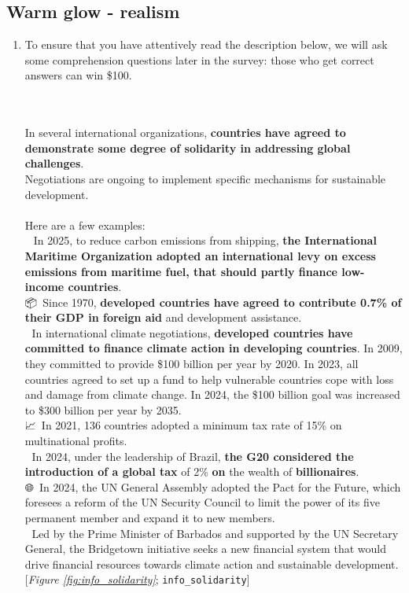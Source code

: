  \subsection*{Warm glow - realism} 
 \begin{enumerate}[resume] 
\item  \label{q:info_solidarity} To ensure that you have attentively read the description below, we will ask some comprehension questions later in the survey: those who get correct answers can win \$100.

~\\\\In several international organizations, \textbf{countries have agreed to demonstrate some degree of solidarity in addressing global challenges}.\\
Negotiations are ongoing to implement specific mechanisms for sustainable development.\\\\Here are a few examples:\\🚢~In 2025, to reduce carbon emissions from shipping, \textbf{the International Maritime Organization adopted an international levy on excess emissions from maritime fuel, that should partly finance low-income countries}.\\📦~Since 1970, \textbf{developed countries have agreed to contribute 0.7\% of their GDP in foreign aid} and development assistance.\\
🌱 In international climate negotiations, \textbf{developed countries have committed to finance climate action in developing countries}. In 2009, they committed to provide \$100 billion per year by 2020. In 2023, all countries agreed to set up a fund to help vulnerable countries cope with loss and damage from climate change. In 2024, the \$100 billion goal was increased to \$300 billion per year by 2035.\\📈~In 2021, 136 countries adopted a minimum tax rate of 15\% on multinational profits.\\💎 In 2024, under the leadership of Brazil, \textbf{the G20 considered the introduction of a global tax} of 2\% \textbf{on }the wealth of \textbf{billionaires}.
~\\🌐~In 2024, the UN General Assembly adopted the Pact for the Future, which foresees a reform of the UN Security Council to limit the power of its five permanent member and expand it to new members.\\🔄 Led by the Prime Minister of Barbados and supported by the UN Secretary General, the Bridgetown initiative seeks a new financial system that would drive financial resources towards climate action and sustainable development. [\textit{Figure \ref{fig:info_solidarity}}; 
\verb|info_solidarity|]



\end{enumerate}
